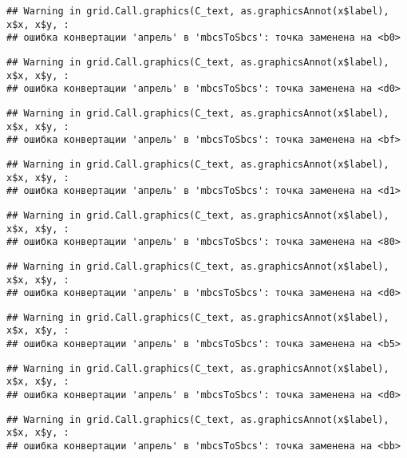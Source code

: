 \documentclass[
]{article}
\begin{document}
\begin{verbatim}
## Warning in grid.Call.graphics(C_text, as.graphicsAnnot(x$label), x$x, x$y, :
## ошибка конвертации 'апрель' в 'mbcsToSbcs': точка заменена на <b0>
\end{verbatim}

\begin{verbatim}
## Warning in grid.Call.graphics(C_text, as.graphicsAnnot(x$label), x$x, x$y, :
## ошибка конвертации 'апрель' в 'mbcsToSbcs': точка заменена на <d0>
\end{verbatim}

\begin{verbatim}
## Warning in grid.Call.graphics(C_text, as.graphicsAnnot(x$label), x$x, x$y, :
## ошибка конвертации 'апрель' в 'mbcsToSbcs': точка заменена на <bf>
\end{verbatim}

\begin{verbatim}
## Warning in grid.Call.graphics(C_text, as.graphicsAnnot(x$label), x$x, x$y, :
## ошибка конвертации 'апрель' в 'mbcsToSbcs': точка заменена на <d1>
\end{verbatim}

\begin{verbatim}
## Warning in grid.Call.graphics(C_text, as.graphicsAnnot(x$label), x$x, x$y, :
## ошибка конвертации 'апрель' в 'mbcsToSbcs': точка заменена на <80>
\end{verbatim}

\begin{verbatim}
## Warning in grid.Call.graphics(C_text, as.graphicsAnnot(x$label), x$x, x$y, :
## ошибка конвертации 'апрель' в 'mbcsToSbcs': точка заменена на <d0>
\end{verbatim}

\begin{verbatim}
## Warning in grid.Call.graphics(C_text, as.graphicsAnnot(x$label), x$x, x$y, :
## ошибка конвертации 'апрель' в 'mbcsToSbcs': точка заменена на <b5>
\end{verbatim}

\begin{verbatim}
## Warning in grid.Call.graphics(C_text, as.graphicsAnnot(x$label), x$x, x$y, :
## ошибка конвертации 'апрель' в 'mbcsToSbcs': точка заменена на <d0>
\end{verbatim}

\begin{verbatim}
## Warning in grid.Call.graphics(C_text, as.graphicsAnnot(x$label), x$x, x$y, :
## ошибка конвертации 'апрель' в 'mbcsToSbcs': точка заменена на <bb>
\end{verbatim}
\end{document}
